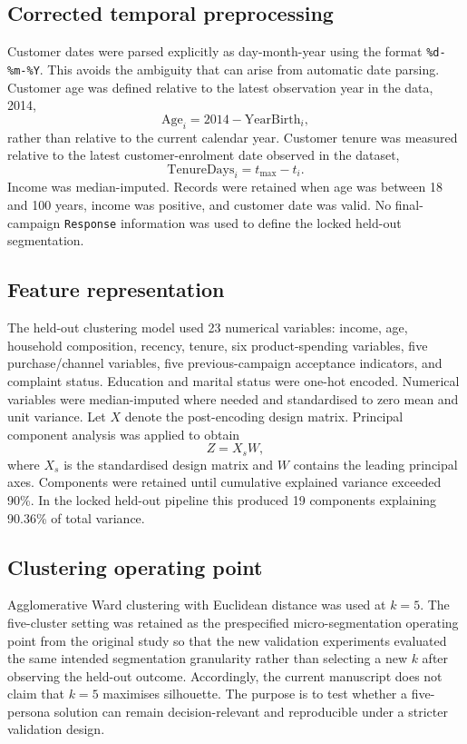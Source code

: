 \documentclass[10pt]{article}
\begin{document}
\subsection{Corrected temporal preprocessing}
Customer dates were parsed explicitly as day-month-year using the format \texttt{\%d-\%m-\%Y}. This avoids the ambiguity that can arise from automatic date parsing. Customer age was defined relative to the latest observation year in the data, 2014,
\begin{equation}
\text{Age}_i = 2014-\text{YearBirth}_i,
\end{equation}
rather than relative to the current calendar year. Customer tenure was measured relative to the latest customer-enrolment date observed in the dataset,
\begin{equation}
\text{TenureDays}_i = t_{\max}-t_i.
\end{equation}
Income was median-imputed. Records were retained when age was between 18 and 100 years, income was positive, and customer date was valid. No final-campaign \texttt{Response} information was used to define the locked held-out segmentation.

\subsection{Feature representation}
The held-out clustering model used 23 numerical variables: income, age, household composition, recency, tenure, six product-spending variables, five purchase/channel variables, five previous-campaign acceptance indicators, and complaint status. Education and marital status were one-hot encoded. Numerical variables were median-imputed where needed and standardised to zero mean and unit variance. Let $X$ denote the post-encoding design matrix. Principal component analysis was applied to obtain
\begin{equation}
Z=X_sW,
\end{equation}
where $X_s$ is the standardised design matrix and $W$ contains the leading principal axes. Components were retained until cumulative explained variance exceeded 90\%. In the locked held-out pipeline this produced 19 components explaining 90.36\% of total variance.

\subsection{Clustering operating point}
Agglomerative Ward clustering with Euclidean distance was used at $k=5$. The five-cluster setting was retained as the prespecified micro-segmentation operating point from the original study so that the new validation experiments evaluated the same intended segmentation granularity rather than selecting a new $k$ after observing the held-out outcome. Accordingly, the current manuscript does not claim that $k=5$ maximises silhouette. The purpose is to test whether a five-persona solution can remain decision-relevant and reproducible under a stricter validation design.
\end{document}
